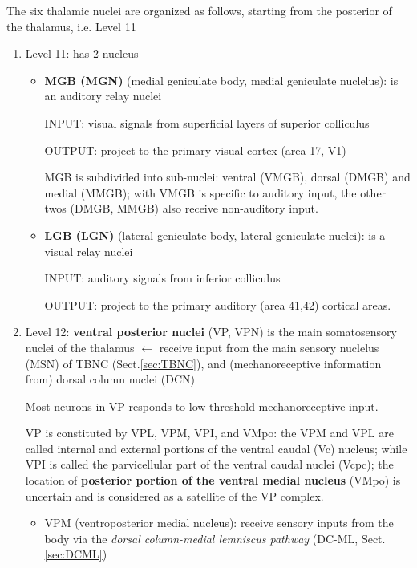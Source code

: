 The six thalamic nuclei are organized as follows, starting from the posterior of
the thalamus, i.e. Level 11
\begin{enumerate}
  \item Level 11: has 2 nucleus

   \begin{itemize}
       \item {\bf MGB (MGN)} (medial geniculate body, medial geniculate
    nuclelus): is an auditory relay nuclei
    
    INPUT: visual signals from superficial layers of superior colliculus
    
    OUTPUT: project to the primary visual cortex (area 17, V1)

MGB is subdivided  into sub-nuclei: ventral (VMGB), dorsal (DMGB) and medial
(MMGB); with VMGB is specific to auditory input, the other twos (DMGB, MMGB)
also receive non-auditory input.

        \item {\bf LGB (LGN)} (lateral geniculate body, lateral geniculate
  nuclei): is a visual relay nuclei
  
	INPUT: auditory signals from inferior colliculus 
	
	OUTPUT: project to the primary	auditory (area 41,42) cortical areas.

   \end{itemize}

  \item Level 12: 
  {\bf ventral posterior nuclei} (VP, VPN) is the main
  somatosensory nuclei of the thalamus $\leftarrow$ receive input
  from the main sensory nuclelus (MSN) of TBNC (Sect.\ref{sec:TBNC}), and
  (mechanoreceptive information from) dorsal column nuclei (DCN)

  Most neurons in VP responds to low-threshold mechanoreceptive input.

 VP is constituted by VPL, VPM, VPI, and VMpo: the 
  VPM and VPL are called internal and external portions of the ventral caudal
  (Vc) nucleus; while VPI is called the parvicellular part of the ventral caudal
  nuclei (Vcpc); the location of  {\bf posterior portion of the ventral medial
  nucleus} (VMpo) is uncertain and is considered as a satellite of the VP
  complex.
  
   \begin{itemize}
      \item VPM (ventroposterior medial nucleus): receive sensory inputs from
     the body via the {\it dorsal column-medial lemniscus
     pathway} (DC-ML, Sect.\ref{sec:DCML}) %


\end{itemize}
\end{enumerate}
